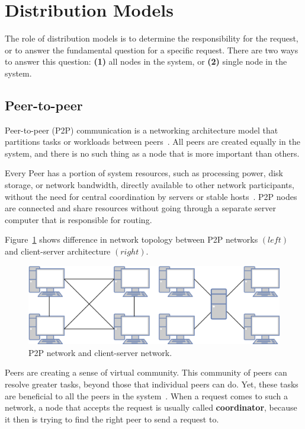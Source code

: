 \section{Distribution Models}\label{sec:distribution_models}
%
The role of distribution models is to determine the responsibility for the request, or to answer the fundamental question  for a specific request. There are two ways to answer this question: \textbf{(1)} all nodes in the system, or \textbf{(2)} single node in the system.
%
%
\subsection{Peer-to-peer}\label{sec:p2p_networks}
%
Peer-to-peer (P2P) communication is a networking architecture model that partitions tasks or workloads between peers~\cite{Schollmeier01}. All peers are created equally in the system, and there is no such thing as a node that is more important than others. 

Every Peer has a portion of system resources, such as processing power, disk storage, or network bandwidth, directly available to other network participants, without the need for central coordination by servers or stable hosts~\cite{Schollmeier01}. P2P nodes are connected and share resources without going through a separate server computer that is responsible for routing. 

Figure~\ref{fig:fig2} shows difference in network topology between P2P networks $(left)$ and client-server architecture $(right)$.

\begin{figure}[H]
	\begin{center}
		\includegraphics[scale=0.6]{images/Figure2}
	\end{center}
	\vspace{-0.6cm}
	\caption{P2P network and client-server network.}
	\label{fig:fig2}
\end{figure}

\noindent
Peers are creating a sense of virtual community. This community of peers can resolve greater tasks, beyond those that individual peers can do. Yet, these tasks are beneficial to all the peers in the system~\cite{BandaraJ13}. When a request comes to such a network, a node that accepts the request is usually called \textbf{coordinator}, because it then is trying to find the right peer to send a request to.

